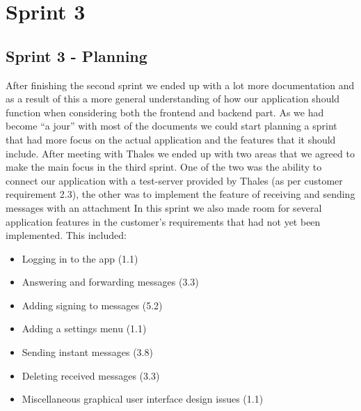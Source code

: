 \chapter{Sprint 3}

\section{Sprint 3 - Planning}
After finishing the second sprint we ended up with a lot more documentation and as a result of this a more general understanding of how our application should function when considering both the frontend and backend part. As we had become “a jour” with most of the documents we could start planning a sprint that had more focus on the actual application and the features that it should include. 
\newline
\newline
After meeting with Thales we ended up with two areas that we agreed to make the main focus in the third sprint. One of the two was the ability to connect our application with a test-server provided by Thales (as per customer requirement 2.3), the other was to implement the feature of receiving and sending messages with an attachment
\newline
\newline
In this sprint we also made room for several application features in the customer's requirements that had not yet been implemented. This included:
\begin{itemize}
\item{}Logging in to the app (1.1)
\item{}Answering and forwarding messages (3.3)
\item{}Adding signing to messages (5.2)
\item{}Adding a settings menu (1.1)
\item{}Sending instant messages (3.8)
\item{}Deleting received messages (3.3)
\item{}Miscellaneous graphical user interface design issues (1.1)
\end{itemize}

